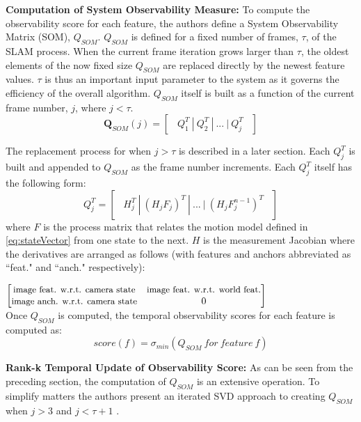 \documentclass[10pt,twocolumn,letterpaper]{article}
\begin{document}
\textbf{Computation of System Observability Measure:} To compute the observability score for each feature,
the authors define a System Observability Matrix (SOM), ${Q}_{SOM}$. ${Q}_{SOM}$ is defined for a fixed number 
of frames, $\tau$, of the SLAM process. When the current frame iteration grows larger than $\tau$, the oldest
 elements of the now fixed size ${Q}_{SOM}$ are replaced directly by the newest feature values. $\tau$ is 
 thus an important input parameter to the system as it governs the efficiency of the overall algorithm. 
 ${Q}_{SOM}$ itself is built as a function of the current frame number, $j$, where 
 $j<\tau$. 
\begin{equation} \label{eq:qsom}
\boldsymbol{Q}_{SOM}(j) = \begin{bmatrix} \ \ Q_1^T \ | \ Q_2^T \ | \ ... \ | \ Q_j^T  \ \ \end{bmatrix}
\end{equation}

The replacement process for when $j>\tau$ is described in a later section. Each $Q_j^T$ is built and appended to ${Q}_{SOM}$ as the frame number increments. Each $Q_j^T$ itself has the following form: 
\begin{equation} \label{eq:Qjjj}
Q_j^T = \begin{bmatrix} \ \ H_j^T \ | \ (H_j F_j)^T \ | \ ... \ | \ (H_j F_j^{n-1})^T  \ \ \end{bmatrix}
\end{equation}
where $F$ is the process matrix that relates the motion model defined in \eqref{eq:stateVector} 
from one state to the next. $H$ is the measurement Jacobian where the derivatives are arranged as follows (with features and anchors abbreviated as ``feat." and ``anch." respectively):

\noindent{}$\begin{bmatrix}
\small{\text{image feat. w.r.t. camera state}}&\small{\text{image feat. w.r.t. world feat.}}\\
\small{\text{image anch. w.r.t. camera state}}&0
\end{bmatrix}$\\


Once $Q_{SOM}$ is computed, the temporal observability scores for each feature is computed as:
\begin{equation} \label{eq:Qjjj}
score(f) = \sigma_{min}(Q_{SOM} \ for \ feature \ f)
\end{equation}

\textbf{Rank-k Temporal Update of Observability Score:} As can be seen from the preceding section, the computation of $Q_{SOM}$ is an extensive operation. To simplify matters the authors present an iterated SVD approach to creating $Q_{SOM}$ when $j>3$  and $j<\tau + 1$ . 
\end{document}
